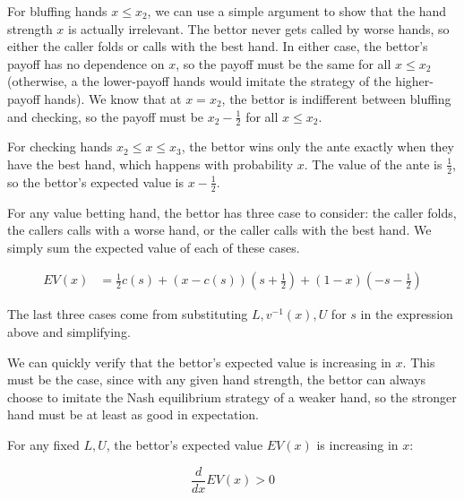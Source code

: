 \documentclass[../../main/main.tex]{subfiles}
\begin{document}
\begin{customproof}
    For bluffing hands $x \leq x_2$, we can use a simple argument to show that the hand strength $x$ is actually irrelevant. The bettor never gets called by worse hands, so either the caller folds or calls with the best hand. In either case, the bettor's payoff has no dependence on $x$, so the payoff must be the same for all $x \leq x_2$ (otherwise, a the lower-payoff hands would imitate the strategy of the higher-payoff hands). We know that at $x=x_2$, the bettor is indifferent between bluffing and checking, so the payoff must be $x_2-\frac{1}{2}$ for all $x \leq x_2$.

    For checking hands $x_2 \leq x \leq x_3$, the bettor wins only the ante exactly when they have the best hand, which happens with probability $x$. The value of the ante is $\frac{1}{2}$, so the bettor's expected value is $x-\frac{1}{2}$.

    For any value betting hand, the bettor has three case to consider: the caller folds, the callers calls with a worse hand, or the caller calls with the best hand. We simply sum the expected value of each of these cases.

    \begin{align*}
        EV(x) & = \frac{1}{2} c(s) + (x - c(s)) \left(s+\frac{1}{2}\right) + (1-x) \left(-s-\frac{1}{2}\right)
    \end{align*}
    
    The last three cases come from substituting $L, v^{-1}(x), U$ for $s$ in the expression above and simplifying.
\end{customproof}

We can quickly verify that the bettor's expected value is increasing in $x$. This must be the case, since with any given hand strength, the bettor can always choose to imitate the Nash equilibrium strategy of a weaker hand, so the stronger hand must be at least as good in expectation.

\begin{theorem}
    \label{thm:ev_increasing}
    For any fixed $L, U$, the bettor's expected value $EV(x)$ is increasing in $x$:

    $$ \frac{d}{dx} EV(x) > 0 $$
\end{theorem}
\end{document}
